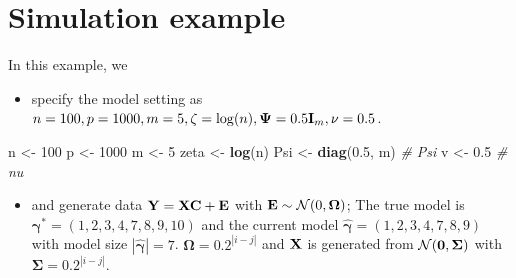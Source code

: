 \documentclass[
]{book}
\newenvironment{Shaded}{\begin{snugshade}}{\end{snugshade}}
\newcommand{\CommentTok}[1]{\textcolor[rgb]{0.56,0.35,0.01}{\textit{#1}}}
\newcommand{\DecValTok}[1]{\textcolor[rgb]{0.00,0.00,0.81}{#1}}
\newcommand{\FloatTok}[1]{\textcolor[rgb]{0.00,0.00,0.81}{#1}}
\newcommand{\KeywordTok}[1]{\textcolor[rgb]{0.13,0.29,0.53}{\textbf{#1}}}
\newcommand{\NormalTok}[1]{#1}
\newcommand{\StringTok}[1]{\textcolor[rgb]{0.31,0.60,0.02}{#1}}
\providecommand{\tightlist}{%
  \setlength{\itemsep}{0pt}\setlength{\parskip}{0pt}}
\begin{document}
\hypertarget{simulation-example}{%
\section{Simulation example}\label{simulation-example}}

In this example, we

\begin{itemize}
\tightlist
\item
  specify the model setting as \(n=100, p = 1000, m = 5, \zeta = \log(n), {\boldsymbol \Psi}= 0.5{\bf I}_m, \nu = 0.5\).
\end{itemize}

\begin{Shaded}
\begin{Highlighting}[]
\NormalTok{n <-}\StringTok{ }\DecValTok{100}
\NormalTok{p <-}\StringTok{ }\DecValTok{1000}
\NormalTok{m <-}\StringTok{ }\DecValTok{5}
\NormalTok{zeta <-}\StringTok{ }\KeywordTok{log}\NormalTok{(n)}
\NormalTok{Psi <-}\StringTok{ }\KeywordTok{diag}\NormalTok{(}\FloatTok{0.5}\NormalTok{, m)  }\CommentTok{# Psi}
\NormalTok{v <-}\StringTok{ }\FloatTok{0.5}  \CommentTok{# nu}
\end{Highlighting}
\end{Shaded}

\begin{itemize}
\tightlist
\item
  and generate data \({\bf Y}={\bf X}{\bf C}+ {\bf E}\) with \({\bf E}\sim \mathcal{N}(0, {\boldsymbol\Omega})\); The true model is \({\boldsymbol \gamma}^* = (1,2,3,4,7,8,9,10)\) and the current model \(\hat{\boldsymbol \gamma}= (1,2,3,4,7,8,9)\) with model size \(|\hat{\boldsymbol \gamma}| = 7\). \({\boldsymbol\Omega}= 0.2^{|i-j|}\) and \({\bf X}\) is generated from \(\mathcal{N}({\bf 0}, {\boldsymbol \Sigma})\) with \({\boldsymbol \Sigma}= 0.2^{|i-j|}\).
\end{itemize}
\end{document}
